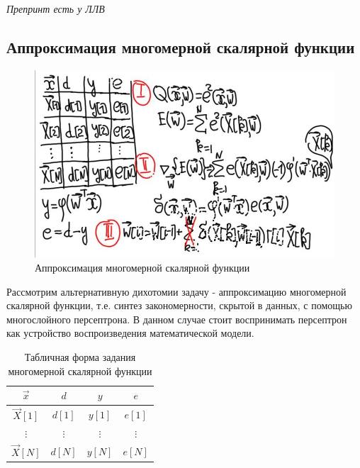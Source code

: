 \documentclass[a4paper]{article}
\numberwithin{equation}{subsection}
\begin{document}
\begin{myquote}
    \textit{Препринт есть у ЛЛВ}
\end{myquote}




\subsection{Аппроксимация многомерной скалярной функции}

\begin{figure}[htbp]
    \centering
    \includegraphics[height=7cm]{hyperflat_9_1.jpeg}
    \caption{Аппроксимация многомерной скалярной функции}
    \label{hyperflat_9_1}
\end{figure}

Рассмотрим альтернативную дихотомии задачу - аппроксимацию многомерной скалярной функции,  т.е.
синтез закономерности, скрытой в данных, с помощью многослойного персептрона.
В данном случае стоит воспринимать персептрон как устройство воспроизведения математической модели.

\begin{table}[H]
    \centering
    \begin{tabular}{| c | c | c | c |}
        \hline
        $\vec{x}$ & $d$ & $y$ & $e$ \\
        \hline
        $\vec{X}[1]$ & $d[1]$ & $y[1]$ & $e[1]$ \\
        \hline
        $\vdots$ & $\vdots$ & $\vdots$ & $\vdots$ \\
        \hline
        $\vec{X}[N]$ & $d[N]$ & $y[N]$ & $e[N]$ \\
        \hline
    \end{tabular}
    \label{table:scalar-func-table}
    \caption{Табличная форма задания многомерной скалярной функции}
\end{table}
\end{document}

